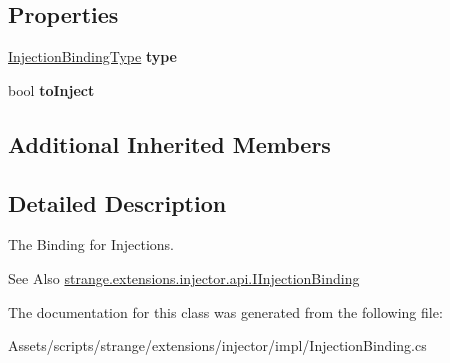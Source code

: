 \subsection*{Properties}
\begin{DoxyCompactItemize}
\item 
\hypertarget{classstrange_1_1extensions_1_1injector_1_1impl_1_1_injection_binding_a915f5c97eceb69c2d893e8874cc255d1}{\hyperlink{namespacestrange_1_1extensions_1_1injector_1_1api_aaf5414484d7eccb5c502984bd70549ae}{Injection\-Binding\-Type} {\bfseries type}}\label{classstrange_1_1extensions_1_1injector_1_1impl_1_1_injection_binding_a915f5c97eceb69c2d893e8874cc255d1}

\item 
\hypertarget{classstrange_1_1extensions_1_1injector_1_1impl_1_1_injection_binding_aeb55d17167b209c72042d67dee584070}{bool {\bfseries to\-Inject}}\label{classstrange_1_1extensions_1_1injector_1_1impl_1_1_injection_binding_aeb55d17167b209c72042d67dee584070}

\end{DoxyCompactItemize}
\subsection*{Additional Inherited Members}


\subsection{Detailed Description}
The Binding for Injections. 

\begin{DoxySeeAlso}{See Also}
\hyperlink{interfacestrange_1_1extensions_1_1injector_1_1api_1_1_i_injection_binding}{strange.\-extensions.\-injector.\-api.\-I\-Injection\-Binding} 
\end{DoxySeeAlso}


The documentation for this class was generated from the following file\-:\begin{DoxyCompactItemize}
\item 
Assets/scripts/strange/extensions/injector/impl/Injection\-Binding.\-cs\end{DoxyCompactItemize}
